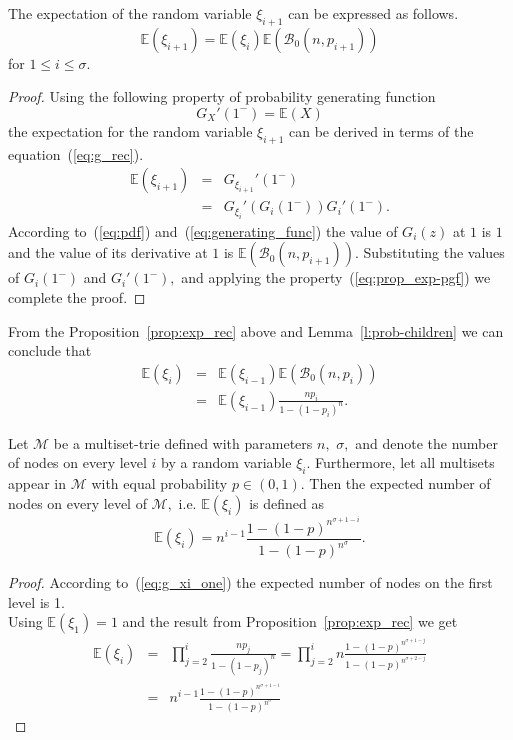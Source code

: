 \begin{proposition}\label{prop:exp_rec}
The expectation of the random variable $\xi_{i+1}$ can be expressed 
as follows.
\[
\mathbb{E}(\xi_{i+1}) = \mathbb{E}(\xi_i)\mathbb{E}(\mathcal{B}_0(n,p_{i+1}))
\]
for $1\leq i\leq\sigma.$
\end{proposition}
\begin{proof}
Using the following property of probability generating function
\begin{equation}\label{eq:prop_exp-pgf}
G_X'(1^-) = \mathbb{E}(X)
\end{equation}
the expectation for the random variable $\xi_{i+1}$ can be derived in terms of 
the equation~(\ref{eq:g_rec}).
\begin{eqnarray}\label{eq:exp}
\mathbb{E}(\xi_{i+1}) &=& G_{\xi_{i+1}}'(1^-) \nonumber \\
&=& G_{\xi_i}'(G_i(1^-))G_i'(1^-).
\end{eqnarray}
According to~(\ref{eq:pdf}) and~(\ref{eq:generating_func}) the value of $G_i(z)$ at 
$1$ is $1$ and the value of its derivative at $1$ is $\mathbb{E}(\mathcal{B}_0(n,p_{i+1})).$ 
Substituting the values of $G_i(1^-)$ and $G_i'(1^-),$ and applying the 
property~(\ref{eq:prop_exp-pgf}) we complete the proof.
\end{proof}
%
From the Proposition~\ref{prop:exp_rec} above and Lemma~\ref{l:prob-children} we 
can conclude that 
\begin{eqnarray}
\mathbb{E}(\xi_{i}) &=& \mathbb{E}(\xi_{i-1})\mathbb{E}\left( \mathcal{B}_0(n,p_{i}) \right) \nonumber \\
& = & \mathbb{E}(\xi_{i-1})\frac{np_{i}}{1-(1-p_{i})^n}.
\end{eqnarray}

\begin{theorem}\label{thm:exp_level}
Let $\mathcal{M}$ be a multiset-trie defined with parameters $n,$ $\sigma,$ and denote the number 
of nodes on every level $i$ by a random variable $\xi_i.$ Furthermore, let all multisets appear in 
$\mathcal{M}$ with equal probability $p\in (0,1).$ Then the expected number 
of nodes on every level of $\mathcal{M},$ i.e. $\mathbb{E}(\xi_i)$ is defined as 
\begin{equation}\label{eq:nodes_level}
\mathbb{E}(\xi_{i}) = n^{i-1} \frac{1-(1-p)^{n^{\sigma +1 -i}}}{1-(1-p)^{n^{\sigma}}}.
\end{equation}
\end{theorem}
\begin{proof}
According to~(\ref{eq:g_xi_one}) the expected number of nodes on the first level is 1. \\
Using $\mathbb{E}(\xi_1) = 1$ and the result from Proposition~\ref{prop:exp_rec}
we get
\begin{eqnarray*}
\mathbb{E}(\xi_{i}) &=& \prod_{j=2}^{i} \frac{n p_j}{1-(1-p_j)^n}
= \prod_{j=2}^{i} n \frac{1-(1-p)^{n^{\sigma +1-j}}}{1-(1-p)^{n^{\sigma + 2 -j}}} \\
&=& n^{i-1} \frac{1-(1-p)^{n^{\sigma +1 -i}}}{1-(1-p)^{n^{\sigma}}}
\end{eqnarray*}
\end{proof}

